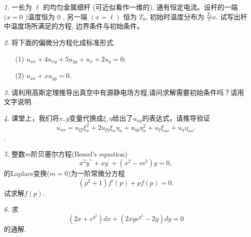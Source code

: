 \documentclass[11pt]{article}
\theoremstyle{remark}
\newtheorem{problem}{}
\begin{document}
\renewcommand{\labelenumi}{(\arabic{enumi})}
\renewcommand{\labelenumii}{(\arabic{enumi}.\arabic{enumii})}

\begin{problem}
  一长为 $\ell$ 的均匀金属细杆 (可近似看作一维的), 
  通有恒定电流。设杆的一端 $(x=0$ )温度恒为 0 , 另一端 $(x=\ell)$ 恒为 $T_0$, 
  初始时温度分布为 $\frac{T_0}{\ell} x$.
  试写出杆中温度场所满足的方程, 边界条件与初始条件。
\end{problem}

\vspace{2em}

\begin{problem}
 将下面的偏微分方程化成标准形式.
 \begin{itemize}
  \item [(1)] $
  u_{x x}+4 u_{x y}+5 u_{y y}+u_x+2 u_y=0;
  $
  \item [(2)]
  $
  u_{x x}+x u_{y y}=0.
  $

 \end{itemize}

\end{problem}
  

\begin{problem}
请利用高斯定理推导出真空中有源静电场方程,请问求解需要初始条件吗？请用文字说明.
\end{problem}

\begin{problem}
  课堂上，我们将$x,y$变量代换成$\xi, \eta$给出了$u_{xy}$的表达式，请推导验证
  $$
  u_{x x} 
  =u_{\xi \xi} \xi_x^2+2 u_{\xi \eta} \xi_x \eta_x+u_{\eta \eta} \eta_x^2+u_{\xi} \xi_{x x}+u_\eta \eta_{x x}.
  $$.
\end{problem}
   
\begin{problem}
  整数$m$阶贝塞尔方程(Bessel's equation)
  $$
    x^2 y^{\prime \prime}+x y^{\prime}+\left(x^2-m^2\right) y = 0, 
  $$
的Laplace变换($m = 0$)为一阶常微分方程
  $$
   (p^2 + 1) f'(p) + pf(p) = 0.
  $$
   试求解$f(p)$.
\end{problem}

\begin{problem}
求$$
(2x + e^{y^2}) dx + (2xy e^{y^2} -2y ) dy = 0
$$
的通解.
\end{problem}
  



  
  




\end{document}
